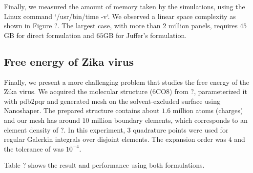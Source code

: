 Finally, we measured the amount of memory taken by the simulations, using the Linux command `/usr/bin/time -v`.
We observed a linear space complexity as shown in Figure ?.
The largest case, with more than $2$ million panels, requires $45$GB for direct formulation and $65$GB for Juffer's formulation.

\subsection{Free energy of Zika virus}

Finally, we present a more challenging problem that studies the free energy of the Zika virus.
We acquired the molecular structure (6CO8) from ?, parameterized it with pdb2pqr and generated mesh on the solvent-excluded surface using Nanoshaper.
The prepared structure contains about $1.6$ million atoms (charges) and our mesh has around $10$ million boundary elements, which corresponds to an element density of ?.
In this experiment, $3$ quadrature points were used for regular Galerkin integrals over disjoint elements.
The \fmm expansion order was $4$ and the tolerance of \gmres was $10^{-4}$.

Table ? shows the result and performance using both formulations.